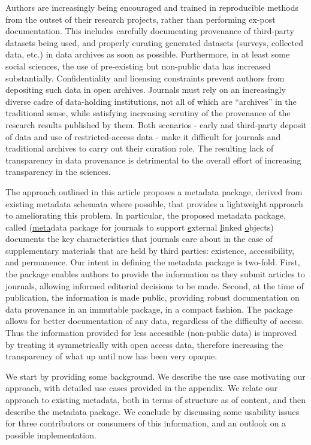 Authors are increasingly being encouraged and trained in reproducible methods from the outset of their research projects, rather than performing ex-post documentation. This includes carefully documenting provenance of third-party datasets being used, and properly curating generated datasets (surveys, collected data, etc.) in data archives as soon as possible. Furthermore, in at least some social sciences, the use of pre-existing but non-public data has increased substantially.  Confidentiality and licensing constraints prevent authors from depositing such data in open archives. Journals must rely on an increasingly diverse cadre of data-holding institutions, not all of which are ``archives'' in the traditional sense, while satisfying increasing scrutiny of the provenance of the research results published by them. Both scenarios - early and third-party deposit of data and use of restricted-access data - make it difficult for journals and traditional archives to carry out their curation role. The resulting lack of transparency in data provenance is detrimental to the overall effort of increasing transparency in the sciences.

The approach outlined in this article proposes a metadata package, derived from existing metadata schemata where possible, that provides a lightweight approach to ameliorating this problem. In particular, the proposed metadata package, called \metajelo (\underline{meta}data package for \underline{j}ournals to support \underline{e}xternal \underline{l}inked \underline{o}bjects) documents the key characteristics that journals care about in the case of supplementary materials that are held by third parties: existence, accessibility, and permanence. Our intent in defining the metadata package is two-fold. First, the package enables  authors to provide the information as they submit articles to journals, allowing informed editorial decisions to be made. Second, at the time of publication, the information is made public, providing robust documentation on data provenance in an immutable package, in a compact fashion.  The package allows for better documentation of any data, regardless of the difficulty of access.   Thus the information provided for less accessible (non-public data) is improved by treating it symmetrically with open access data, therefore increasing the transparency of what up until now has been very opaque.

We start by providing some background. We describe the use case motivating our approach, with detailed use cases provided in the appendix. We relate our approach to existing metadata, both in terms of structure as of content, and then describe the metadata package. We conclude by discussing some usability issues for three contributors or consumers of this information, and an outlook on a possible implementation.